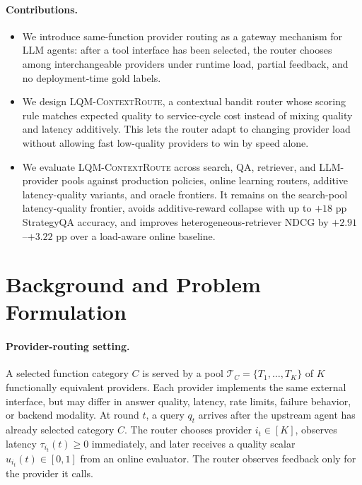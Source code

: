 \documentclass[11pt]{article}
\newcommand{\lqmcr}{\textsc{LQM-ContextRoute}}
\begin{document}
\paragraph{Contributions.}
\begin{itemize}
\setlength\itemsep{1pt}
\item We introduce same-function provider routing as a gateway mechanism for LLM agents: after a tool interface has been selected, the router chooses among interchangeable providers under runtime load, partial feedback, and no deployment-time gold labels.
\item We design \lqmcr{}, a contextual bandit router whose scoring rule matches expected quality to service-cycle cost instead of mixing quality and latency additively. This lets the router adapt to changing provider load without allowing fast low-quality providers to win by speed alone.
\item We evaluate \lqmcr{} across search, QA, retriever, and LLM-provider pools against production policies, online learning routers, additive latency-quality variants, and oracle frontiers. It remains on the search-pool latency-quality frontier, avoids additive-reward collapse with up to $+18$ pp StrategyQA accuracy, and improves heterogeneous-retriever NDCG by $+2.91$--$+3.22$ pp over a load-aware online baseline.
\end{itemize}

\section{Background and Problem Formulation}
\label{sec:motivation}
\label{sec:problem}

\paragraph{Provider-routing setting.} A selected function category $C$ is served by a pool $\mathcal{T}_C\!=\!\{T_1,\ldots,T_K\}$ of $K$ functionally equivalent providers. Each provider implements the same external interface, but may differ in answer quality, latency, rate limits, failure behavior, or backend modality. At round $t$, a query $q_t$ arrives after the upstream agent has already selected category $C$. The router chooses provider $i_t\!\in\![K]$, observes latency $\tau_{i_t}(t)\!\ge\!0$ immediately, and later receives a quality scalar $u_{i_t}(t)\!\in\![0,1]$ from an online evaluator. The router observes feedback only for the provider it calls.
\end{document}
